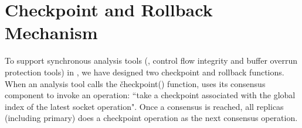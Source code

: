 

% 
% 



\section{Checkpoint and Rollback Mechanism} \label{sec:checkpoint}

To support synchronous analysis tools (\eg, control flow integrity and buffer 
overrun protection tools) in \xxx, we have designed two checkpoint and rollback 
functions. When an analysis tool calls the \v{checkpoint()} function, \xxx uses 
its \paxos consensus component to invoke an operation: ``take a checkpoint 
associated with the global index of the latest socket operation". Once a 
consensus is reached, all replicas (including primary) does a checkpoint 
operation as the next consensus operation.


